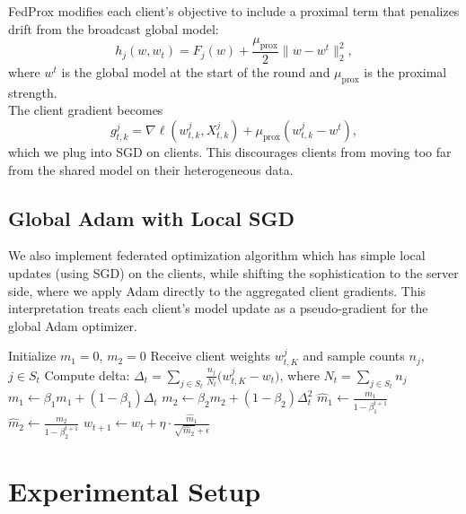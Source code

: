 \documentclass[10pt,twocolumn,letterpaper]{article}
\begin{document}
    FedProx modifies each client's objective to include a proximal term that
    penalizes drift from the broadcast global model:
    \begin{equation}
        h_j(w,w_t) = F_j(w) + 
        \frac{\mu_{\text{prox}}}{2}\|w - w^t\|_2^2,
    \end{equation} where $w^t$ is the global model at the start of the round and $\mu_{\text{prox}}$ is the proximal strength.\\
    The client gradient becomes
    \begin{equation}
        g_{t,k}^{j} = \nabla \ell(w_{t,k}^{j},X_{t,k}^j) 
        + \mu_{\text{prox}} (w_{t,k}^{j} - w^t),
    \end{equation}
    which we plug into SGD on clients. This discourages clients from moving too far from the shared model on their heterogeneous data.

\subsection{Global Adam with Local SGD}
\label{sec:global_adam}
We also implement federated optimization algorithm which has simple local updates
(using SGD) on the clients, while shifting the sophistication to the
server side, where we apply Adam directly to the aggregated client gradients. This interpretation treats each client’s model update as a pseudo-gradient
for the global Adam optimizer.


\begin{algorithm}[ht]
\caption{Global Adam Update with Aggregated Client Deltas}
\begin{algorithmic}[1]
\State Initialize $m_1 = 0$, $m_2 = 0$ 
    \State Receive client weights $w_{t,K}^j$ and sample counts $n_j$, $j \in S_t$
    \State Compute delta: $\Delta_t=\sum_{j \in S_t}\frac{n_j}{N_t}\big(w_{t,K}^{j}-w_{t}\big)$, where $N_t=\sum_{j \in S_t} n_j$
    \State $m_1 \gets \beta_1 m_1 + (1 - \beta_1)\Delta_t$
    \State $m_2 \gets \beta_2 m_2 + (1 - \beta_2)\Delta_t^2$
    \State $\hat{m}_1 \gets \frac{m_1}{1 - \beta_1^{t+1}}$ 
    \State $\hat{m}_2 \gets \frac{m_2}{1 - \beta_2^{t+1}}$
    \State $w_{t+1} \gets w_{t} + \eta \cdot \frac{\hat{m}_1}{\sqrt{\hat{m}_2} + \epsilon}$ 
\EndFor
\end{algorithmic}
\end{algorithm}

    \section{Experimental Setup}
\label{sec:exp_setup}
\end{document}
